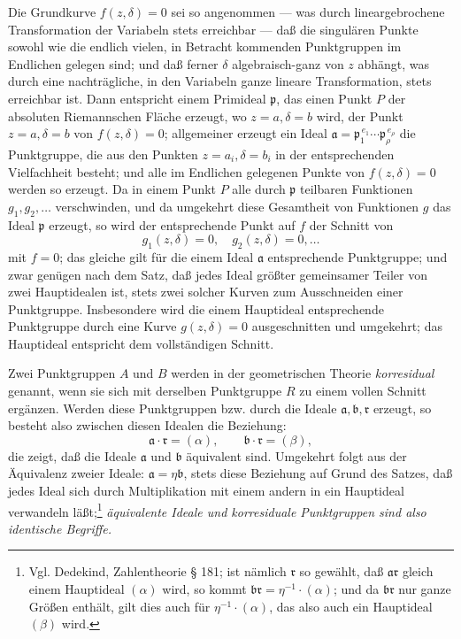 \documentclass[11pt]{article}
\providecommand{\frp}{\mathfrak p}
\providecommand{\fra}{\mathfrak a}
\providecommand{\frb}{\mathfrak b}
\providecommand{\frr}{\mathfrak r}
\begin{document}
Die Grundkurve \(f(z,\delta)=0\) sei so angenommen --- was durch lineargebrochene Transformation der Variabeln stets erreichbar --- daß die singulären Punkte sowohl wie die endlich vielen, in Betracht kommenden Punktgruppen im Endlichen gelegen sind; und daß ferner \(\delta\) algebraisch-ganz von \(z\) abhängt, was durch eine nachträgliche, in den Variabeln ganze lineare Transformation, stets erreichbar ist. Dann entspricht einem Primideal \(\frp\), das einen Punkt \(P\) der absoluten Riemannschen Fläche erzeugt, wo \(z=a,\delta=b\) wird, der Punkt \(z=a,\delta=b\) von \(f(z,\delta)=0\); allgemeiner erzeugt ein Ideal \(\fra=\frp_1^{\,e_1}\cdots\frp_\rho^{\,e_\rho}\) die Punktgruppe, die aus den Punkten \(z=a_i,\delta=b_i\) in der entsprechenden Vielfachheit besteht; und alle im Endlichen gelegenen Punkte von \(f(z,\delta)=0\) werden so erzeugt. Da in einem Punkt \(P\) alle durch \(\frp\) teilbaren Funktionen \(g_1,g_2,\ldots\) verschwinden, und da umgekehrt diese Gesamtheit von Funktionen \(g\) das Ideal \(\frp\) erzeugt, so wird der entsprechende Punkt auf \(f\) der Schnitt von
\[
g_1(z,\delta)=0,\quad g_2(z,\delta)=0,\ldots
\]
mit \(f=0\); das gleiche gilt für die einem Ideal \(\fra\) entsprechende Punktgruppe; und zwar genügen nach dem Satz, daß jedes Ideal größter gemeinsamer Teiler von zwei Hauptidealen ist, stets zwei solcher Kurven zum Ausschneiden einer Punktgruppe. Insbesondere wird die einem Hauptideal entsprechende Punktgruppe durch eine Kurve \(g(z,\delta)=0\) ausgeschnitten und umgekehrt; das Hauptideal entspricht dem vollständigen Schnitt.

Zwei Punktgruppen \(A\) und \(B\) werden in der geometrischen Theorie \emph{korresidual} genannt, wenn sie sich mit derselben Punktgruppe \(R\) zu einem vollen Schnitt ergänzen. Werden diese Punktgruppen bzw. durch die Ideale \(\fra,\frb,\frr\) erzeugt, so besteht also zwischen diesen Idealen die Beziehung:
\[
\fra\cdot\frr=(\alpha),\qquad \frb\cdot\frr=(\beta),
\]
die zeigt, daß die Ideale \(\fra\) und \(\frb\) äquivalent sind. Umgekehrt folgt aus der Äquivalenz zweier Ideale: \(\fra=\eta\frb\), stets diese Beziehung auf Grund des Satzes, daß jedes Ideal sich durch Multiplikation mit einem andern in ein Hauptideal verwandeln läßt;\footnote{Vgl. Dedekind, Zahlentheorie § 181; ist nämlich \(\frr\) so gewählt, daß \(\fra\frr\) gleich einem Hauptideal \((\alpha)\) wird, so kommt \(\frb\frr=\eta^{-1}\cdot(\alpha)\); und da \(\frb\frr\) nur ganze Größen enthält, gilt dies auch für \(\eta^{-1}\cdot(\alpha)\), das also auch ein Hauptideal \((\beta)\) wird.} \emph{äquivalente Ideale und korresiduale Punktgruppen sind also identische Begriffe.}
\end{document}
